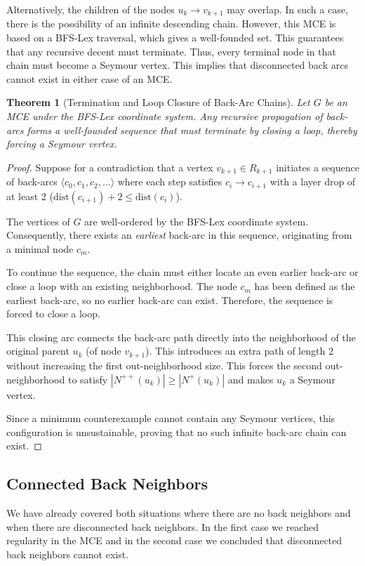 \documentclass[AMS, Times1COL]{article} %
\newtheorem{theorem}{Theorem}[section]
\theoremstyle{definition}
\begin{document}
	Alternatively, the children of the nodes $u_k \to v_{k+1}$ may overlap. In such a case, there is the possibility of an infinite descending chain. However, this MCE is based on a BFS-Lex traversal, which gives a well-founded set. This guarantees that any recursive decent must terminate. Thus, every terminal node in that chain must become a Seymour vertex. This implies that disconnected back arcs cannot exist in either case of an MCE. 
	
	\begin{theorem}[Termination and Loop Closure of Back-Arc Chains]
		Let $G$ be an MCE under the BFS-Lex coordinate system. Any recursive propagation of back-arcs forms a well-founded sequence that must terminate by closing a loop, thereby forcing a Seymour vertex.
		\label{no_chain}
	\end{theorem}
	
	\begin{proof}
		Suppose for a contradiction that a vertex $v_{k+1} \in R_{k+1}$ initiates a sequence of back-arcs $\langle c_0, c_1, c_2, \dots \rangle$ where each step satisfies $c_i \to c_{i+1}$ with a layer drop of at least 2 ($\text{dist}(c_{i+1}) + 2 \le \text{dist}(c_i)$). 
		
		The vertices of $G$ are well-ordered by the BFS-Lex coordinate system. Consequently, there exists an \emph{earliest} back-arc in this sequence, originating from a minimal node $c_m$.
		
		To continue the sequence, the chain must either locate an even earlier back-arc or close a loop with an existing neighborhood. The node $c_m$ has been defined as the earliest back-arc, so no earlier back-arc can exist. Therefore, the sequence is forced to close a loop.
		
		This closing arc connects the back-arc path directly into the neighborhood of the original parent $u_k$ (of node $v_{k+1}$). This introduces an extra path of length 2 without increasing the first out-neighborhood size. This forces the second out-neighborhood to satisfy $|N^{++}(u_k)| \ge |N^{+}(u_k)|$ and makes $u_k$ a Seymour vertex.
		
		Since a minimum counterexample cannot contain any Seymour vertices, this configuration is unsustainable, proving that no such infinite back-arc chain can exist.
	\end{proof}
	
	\subsection{Connected Back Neighbors}
	We have already covered both situations where there are no back neighbors and when there are disconnected back neighbors. In the first case we reached regularity in the MCE and in the second case we concluded that disconnected back neighbors cannot exist. 
	
\end{document}
